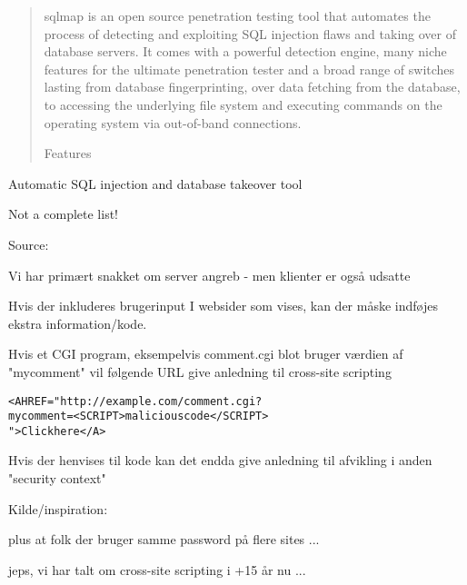 \documentclass[20pt,landscape,a4paper,footrule]{foils}
\begin{document}

\begin{quote}\small
sqlmap is an open source penetration testing tool that automates the process of detecting and exploiting SQL injection flaws and taking over of database servers. It comes with a powerful detection engine, many niche features for the ultimate penetration tester and a broad range of switches lasting from database fingerprinting, over data fetching from the database, to accessing the underlying file system and executing commands on the operating system via out-of-band connections.

Features
\end{quote}

\begin{list1}
\item Automatic SQL injection and database takeover tool
\end{list1}




Not a complete list!

Source: 


Vi har primært snakket om server angreb - men klienter er også udsatte

\begin{list1}
\item Hvis der inkluderes brugerinput I websider som vises, kan
der måske indføjes ekstra information/kode.
\item Hvis et CGI program, eksempelvis comment.cgi blot bruger værdien af "mycomment" vil
følgende URL give anledning til cross-site scripting
\begin{alltt}
<A HREF="http://example.com/comment.cgi?
mycomment=<SCRIPT>malicious code</SCRIPT>
">Click here</A>
\end{alltt}
\item Hvis der henvises til kode kan det endda give anledning til
afvikling i anden "security context"
\item Kilde/inspiration:
\end{list1}

\centerline{plus at folk der bruger samme password på flere sites ...}

jeps, vi har talt om cross-site scripting i +15 år nu ...
\end{document}
